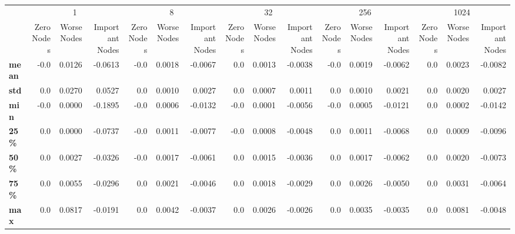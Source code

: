 \begin{tabular}{lrrrrrrrrrrrrrrr}
\toprule
{} & \multicolumn{3}{c}{1} & \multicolumn{3}{c}{8} & \multicolumn{3}{c}{32} & \multicolumn{3}{c}{256} & \multicolumn{3}{c}{1024} \\
{} & Zero Nodes & Worse Nodes & Important Nodes & Zero Nodes & Worse Nodes & Important Nodes & Zero Nodes & Worse Nodes & Important Nodes & Zero Nodes & Worse Nodes & Important Nodes & Zero Nodes & Worse Nodes & Important Nodes \\
\midrule
\textbf{mean} &       -0.0 &      0.0126 &         -0.0613 &       -0.0 &      0.0018 &         -0.0067 &        0.0 &      0.0013 &         -0.0038 &       -0.0 &      0.0019 &         -0.0062 &        0.0 &      0.0023 &         -0.0082 \\
\textbf{std } &        0.0 &      0.0270 &          0.0527 &        0.0 &      0.0010 &          0.0027 &        0.0 &      0.0007 &          0.0011 &        0.0 &      0.0010 &          0.0021 &        0.0 &      0.0020 &          0.0027 \\
\textbf{min } &       -0.0 &      0.0000 &         -0.1895 &       -0.0 &      0.0006 &         -0.0132 &       -0.0 &      0.0001 &         -0.0056 &       -0.0 &      0.0005 &         -0.0121 &        0.0 &      0.0002 &         -0.0142 \\
\textbf{25\% } &        0.0 &      0.0000 &         -0.0737 &       -0.0 &      0.0011 &         -0.0077 &       -0.0 &      0.0008 &         -0.0048 &        0.0 &      0.0011 &         -0.0068 &        0.0 &      0.0009 &         -0.0096 \\
\textbf{50\% } &        0.0 &      0.0027 &         -0.0326 &       -0.0 &      0.0017 &         -0.0061 &        0.0 &      0.0015 &         -0.0036 &        0.0 &      0.0017 &         -0.0062 &        0.0 &      0.0020 &         -0.0073 \\
\textbf{75\% } &        0.0 &      0.0055 &         -0.0296 &        0.0 &      0.0021 &         -0.0046 &        0.0 &      0.0018 &         -0.0029 &        0.0 &      0.0026 &         -0.0050 &        0.0 &      0.0031 &         -0.0064 \\
\textbf{max } &        0.0 &      0.0817 &         -0.0191 &        0.0 &      0.0042 &         -0.0037 &        0.0 &      0.0026 &         -0.0026 &        0.0 &      0.0035 &         -0.0035 &        0.0 &      0.0081 &         -0.0048 \\
\bottomrule
\end{tabular}
